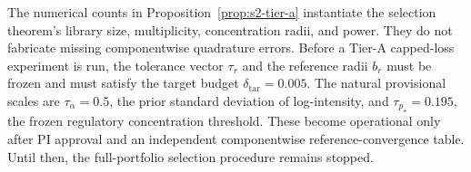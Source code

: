 \begin{remark}
\label{rem:s2-tier-a-hold}
The numerical counts in Proposition~\ref{prop:s2-tier-a} instantiate the
selection theorem's library size, multiplicity, concentration radii, and power.
They do not fabricate missing componentwise quadrature errors.  Before a
Tier-A capped-loss experiment is run, the tolerance vector \(\tau_r\) and the
reference radii \(b_r\) must be frozen and must satisfy the target budget
\(\delta_{\mathrm{tar}}=0.005\).  The natural provisional scales are
\(\tau_\alpha=0.5\), the prior standard deviation of log-intensity, and
\(\tau_{p_\star}=0.195\), the frozen regulatory concentration threshold.
These become operational only after PI approval and an independent
componentwise reference-convergence table.  Until then, the full-portfolio
selection procedure remains stopped.
\end{remark}
